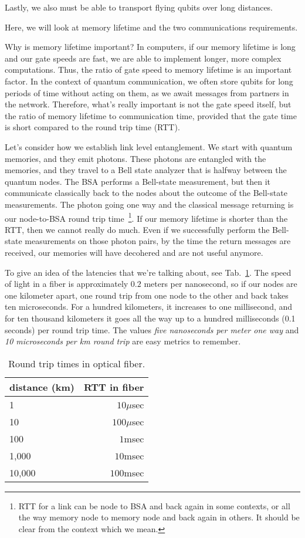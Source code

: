 Lastly, we also must be able to transport flying qubits over long distances.

Here, we will look at memory lifetime and the two communications requirements.

Why is memory lifetime important? In computers, if our memory lifetime is long and our gate speeds are fast, we are able to implement longer, more complex computations.  Thus, the ratio of gate speed to memory lifetime is an important factor. In the context of quantum communication, we often store qubits for long periods of time without acting on them, as we await messages from partners in the network.  Therefore, what's really important is not the gate speed itself, but the ratio of memory lifetime to communication time, 
provided that the gate time is short compared to the round trip time (RTT). 

Let's consider how we establish link level entanglement. We start with quantum memories, and they emit photons. These photons are entangled with the memories, and they travel to a Bell state analyzer that is halfway between the quantum nodes. The BSA performs a Bell-state measurement, but then it communicate classically back to the nodes about the outcome of the Bell-state measurements. The photon going one way and the classical message returning is our node-to-BSA round trip time~\footnote{RTT for a link can be node to BSA and back again in some contexts, or all the way memory node to memory node and back again in others. It should be clear from the context which we mean.}. If our memory lifetime is shorter than the RTT, then we cannot really do much. Even if we successfully perform the Bell-state measurements on those photon pairs, by the time the return messages are received, our memories will have decohered and are not useful anymore.

To give an idea of the latencies that we're talking about, see Tab.~\ref{tab:rtt}. The speed of light in a fiber is approximately $0.2$ meters per nanosecond,
so if our nodes are one kilometer apart, one round trip from one node to the other and back takes ten microseconds. For a hundred kilometers, it increases to one millisecond, and for ten thousand kilometers it goes all the way up to a hundred milliseconds (0.1 seconds) per round trip time.  The values \emph{five nanoseconds per meter one way} and \emph{10 microseconds per km round trip} are easy metrics to remember.

\begin{table}
\centering
\begin{tabular}{l|r}
distance (km)  & RTT in fiber \\\hline
1     & $10\mu$sec \\
10    & $100\mu$sec \\
100   & $1$msec \\
1,000 & $10$msec \\
10,000 & $100$msec
\end{tabular}
\caption{Round trip times in optical fiber.}
\label{tab:rtt}
\end{table}


